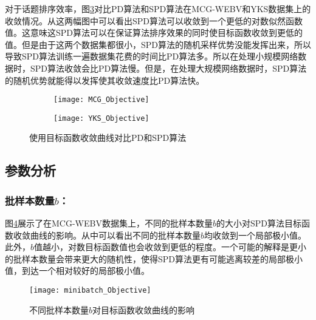 对于话题排序效率，图\ref{fig:cmp-objective}对比PD算法和SPD算法在MCG-WEBV和YKS数据集上的收敛情况。从这两幅图中可以看出SPD算法可以收敛到一个更低的对数似然函数值。这意味这SPD算法可以在保证算法排序效果的同时使目标函数收敛到更低的值。但是由于这两个数据集都很小，SPD算法的随机采样优势没能发挥出来，所以导致SPD算法训练一遍数据集花费的时间比PD算法多。所以在处理小规模网络数据时，SPD算法收敛会比PD算法慢。但是，在处理大规模网络数据时，SPD算法的随机优势就能得以发挥使其收敛速度比PD算法快。
\begin{figure}[!htbp]
    \centering
    \begin{subfigure}[b]{0.5\textwidth}
      \texttt{[image: MCG\_Objective]}
      \caption{}
      \label{fig:objectivecmponmcg}
    \end{subfigure}%
    \begin{subfigure}[b]{0.5\textwidth}
      \texttt{[image: YKS\_Objective]}
      \caption{}
      \label{fig:objectivecmponyks}
    \end{subfigure}%
    \caption{使用目标函数收敛曲线对比PD和SPD算法}
    \label{fig:cmp-objective}
\end{figure}


\subsection{参数分析}

\subsubsection{批样本数量$b$：}

图\ref{fig:minibatch-Objective}展示了在MCG-WEBV数据集上，不同的批样本数量$b$的大小对SPD算法目标函数收敛曲线的影响。从中可以看出不同的批样本数量$b$均收敛到一个局部极小值。此外，$b$值越小，对数目标函数值也会收敛到更低的程度。一个可能的解释是更小的批样本数量会带来更大的随机性，使得SPD算法更有可能逃离较差的局部极小值，到达一个相对较好的局部极小值。
\begin{figure}[!htbp]
    \centering
    \texttt{[image: minibatch\_Objective]}
    \caption{不同批样本数量$b$对目标函数收敛曲线的影响}
    \label{fig:minibatch-Objective}
\end{figure}

